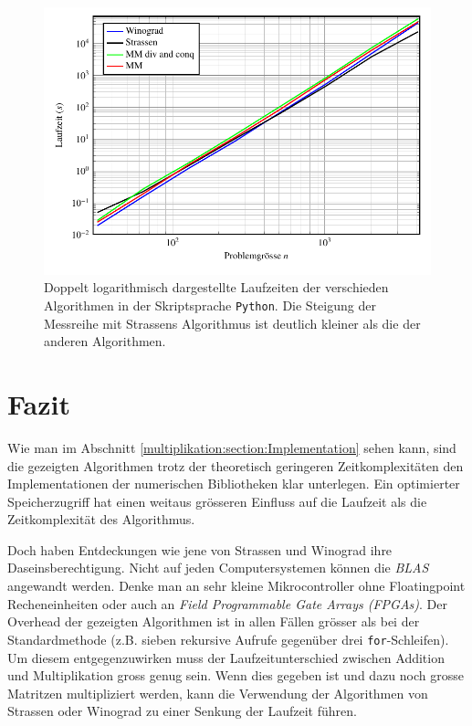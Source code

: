 \begin{figure}
	\center
	\includegraphics[width=\linewidth]{papers/multiplikation/images/meas_python}
	\caption{Doppelt logarithmisch dargestellte Laufzeiten der verschieden Algorithmen in der Skriptsprache \texttt{Python}.
	Die Steigung der Messreihe mit Strassens Algorithmus ist deutlich kleiner als die der anderen Algorithmen.
}
	\label{multiplikation:fig:python}
\end{figure}

\section{Fazit}

Wie man im Abschnitt \ref{multiplikation:section:Implementation} sehen kann, sind die gezeigten Algorithmen trotz der theoretisch geringeren Zeitkomplexitäten den Implementationen der numerischen Bibliotheken klar unterlegen.
Ein optimierter Speicherzugriff hat einen weitaus grösseren Einfluss auf die Laufzeit als die Zeitkomplexität des Algorithmus.

Doch haben Entdeckungen wie jene von Strassen und Winograd ihre Daseinsberechtigung.
Nicht auf jeden Computersystemen können die \textit{BLAS} angewandt werden.
Denke man an sehr kleine Mikrocontroller ohne Floatingpoint Recheneinheiten oder auch an \textit{Field Programmable Gate Arrays (FPGAs)}.
Der Overhead der gezeigten Algorithmen ist in allen Fällen grösser als bei der Standardmethode (z.B. sieben rekursive Aufrufe gegenüber drei \texttt{for}-Schleifen).
Um diesem entgegenzuwirken muss der Laufzeitunterschied zwischen Addition und Multiplikation gross genug sein.
Wenn dies gegeben ist und dazu noch grosse Matritzen multipliziert werden, kann die Verwendung der Algorithmen von Strassen oder Winograd zu einer Senkung der Laufzeit führen.
